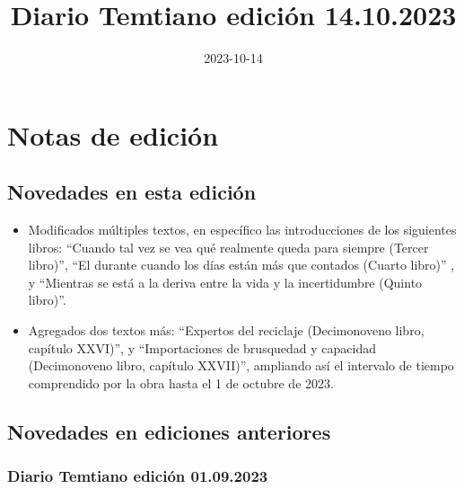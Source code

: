 \documentclass[
]{book}
\title{Diario Temtiano edición 14.10.2023}
\author{}
\date{\vspace{-2.5em}2023-10-14}
\begin{document}
\maketitle

{
\setcounter{tocdepth}{1}
\tableofcontents
}
\hypertarget{notas-de-ediciuxf3n}{%
\chapter*{Notas de edición}\label{notas-de-ediciuxf3n}}

\hypertarget{novedades-en-esta-ediciuxf3n}{%
\section*{Novedades en esta edición}\label{novedades-en-esta-ediciuxf3n}}

\begin{itemize}
\item
  Modificados múltiples textos, en específico las introducciones de los siguientes libros: ``Cuando tal vez se vea qué realmente queda para siempre (Tercer libro)'', ``El durante cuando los días están más que contados (Cuarto libro)'' , y ``Mientras se está a la deriva entre la vida y la incertidumbre (Quinto libro)''.
\item
  Agregados dos textos más: ``Expertos del reciclaje (Decimonoveno libro, capítulo XXVI)'', y ``Importaciones de brusquedad y capacidad (Decimonoveno libro, capítulo XXVII)'', ampliando así el intervalo de tiempo comprendido por la obra hasta el 1 de octubre de 2023.
\end{itemize}

\hypertarget{novedades-en-ediciones-anteriores}{%
\section*{Novedades en ediciones anteriores}\label{novedades-en-ediciones-anteriores}}

\hypertarget{diario-temtiano-ediciuxf3n-01.09.2023}{%
\subsection*{Diario Temtiano edición 01.09.2023}\label{diario-temtiano-ediciuxf3n-01.09.2023}}
\end{document}
